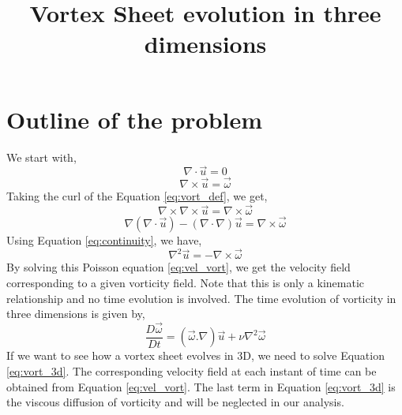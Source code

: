 \documentclass{article}
\title{Vortex Sheet evolution in three dimensions}
\author{}
\date{}
\begin{document}
\maketitle
\section{Outline of the problem}
We start with,
\begin{equation}\label{eq:continuity}
\nabla \cdot \vec{u} = 0
\end{equation}
\begin{equation}\label{eq:vort_def}
\nabla \times \vec{u} =\vec{\omega}
\end{equation}
Taking the curl of the Equation \eqref{eq:vort_def}, we get,
\begin{equation*}
\nabla \times \nabla \times \vec{u} = \nabla \times \vec{\omega}
\end{equation*}
\begin{equation*}
\nabla (\nabla \cdot \vec{u}) -(\nabla \cdot \nabla) \vec{u} = \nabla \times \vec{\omega}
\end{equation*}
Using Equation \eqref{eq:continuity}, we have,
\begin{equation}\label{eq:vel_vort}
\nabla ^2 \vec{u} = - \nabla \times \vec{\omega} 
\end{equation}
By solving this Poisson equation \eqref{eq:vel_vort}, we get the velocity field corresponding to a given vorticity field. Note that this is only a kinematic relationship and no time evolution is involved. The time evolution of vorticity in three dimensions is given by,
\begin{equation}\label{eq:vort_3d}
\frac{D\vec{\omega}}{Dt}=(\vec{\omega}.\nabla)\vec{u}+\nu\nabla^2\vec{\omega}
\end{equation}
If we want to see how a vortex sheet evolves in 3D, we need to solve Equation \eqref{eq:vort_3d}. The corresponding velocity field at each instant of time can be obtained from Equation \eqref{eq:vel_vort}. The last term in Equation \eqref{eq:vort_3d} is the viscous diffusion of vorticity and will be neglected in our analysis. 
\end{document}
